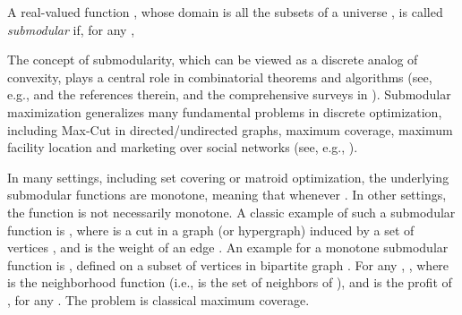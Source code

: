 \documentclass[11pt]{article}
\begin{document}
 A real-valued function , whose domain is all the
 subsets of a universe , is called {\em submodular} if,
 for any ,

The concept of submodularity, which can be viewed as a discrete analog of convexity,
plays a central role in combinatorial theorems and algorithms
(see, e.g., \cite{f99}
and the references therein, and the comprehensive
surveys in \cite{FMV07,Vo08,LMNS09}).
Submodular maximization generalizes many fundamental problems in
discrete optimization, including Max-Cut in directed/undirected
graphs, maximum coverage, maximum facility location and marketing
over social networks (see, e.g., \cite{HMS08}).

In many settings, including set covering or matroid optimization, the
underlying submodular functions are monotone, meaning that  whenever . In other settings, the function 
is not necessarily monotone.
A classic
example of such a submodular function is ,
where  is a cut in a graph (or hypergraph) 
induced by a set of vertices , and  is the weight of an edge .
An example for a monotone submodular function is , defined on a subset of vertices in bipartite graph
. For any , , where  is the neighborhood function (i.e.,  is the
set of neighbors of ), and  is the profit of , for any .
The problem
 is classical maximum coverage.
\end{document}
